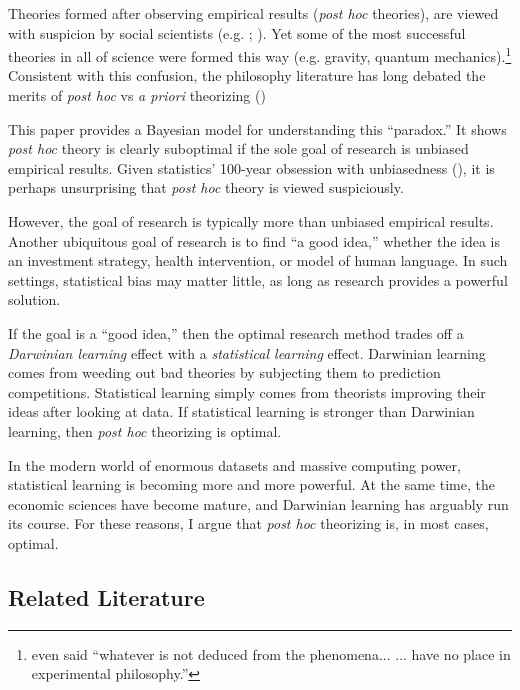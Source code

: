 \documentclass[12pt,english]{article}
\theoremstyle{plain}
\theoremstyle{plain}
\begin{document}
\setcounter{page}{1}

Theories formed after observing empirical results (\emph{post hoc} theories), are viewed with suspicion by social scientists (e.g. \citet{kerr1998harking}; \citet{harvey2017presidential}). Yet some of the most successful theories in all of science were formed this way (e.g. gravity, quantum mechanics).\footnote{\citet{newton1726scholium} even said ``whatever is not deduced from the phenomena... ... have no place in experimental philosophy.''} Consistent with this confusion, the philosophy literature has long debated the merits of \emph{post hoc} vs \emph{a priori} theorizing (\citet{barnes2022prediction})

This paper provides a Bayesian model for understanding this ``paradox.'' It shows \emph{post hoc} theory is clearly suboptimal if the sole goal of research is unbiased empirical results. Given statistics' 100-year obsession with unbiasedness (\citet{efron2001statistical}), it is perhaps unsurprising that \emph{post hoc} theory is viewed suspiciously.

However, the goal of research is typically more than unbiased empirical results. Another ubiquitous goal of research is to find ``a good idea,'' whether the idea is an investment strategy, health intervention, or model of human language. In such settings, statistical bias may matter little, as long as research provides a powerful solution.

If the goal is a ``good idea,'' then the optimal research method trades off a \emph{Darwinian learning} effect with a \emph{statistical learning} effect. Darwinian learning comes from weeding out bad theories by subjecting them to prediction competitions. Statistical learning simply comes from theorists improving their ideas after looking at data. If statistical learning is stronger than Darwinian learning, then \emph{post hoc} theorizing is optimal.

In the modern world of enormous datasets and massive computing power, statistical learning is becoming more and more powerful. At the same time, the economic sciences have become mature, and Darwinian learning has arguably run its course. For these reasons, I argue that \emph{post hoc} theorizing is, in most cases, optimal.

\subsection{Related Literature}
\end{document}
